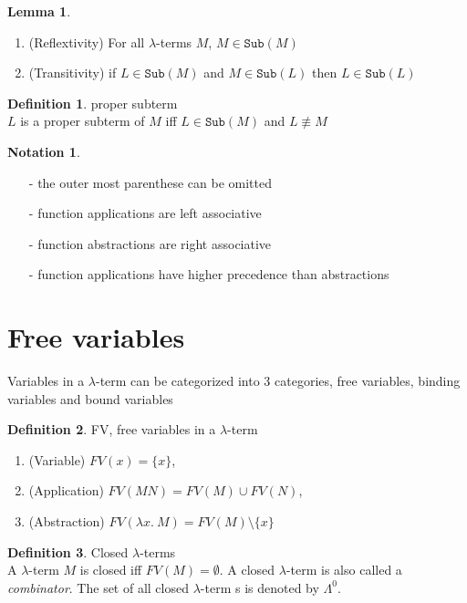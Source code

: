 \documentclass[a4paper]{book}
\theoremstyle{definition}
\newtheorem{definition}{Definition}[section]
\newtheorem{lemma}{Lemma}[section]
\newtheorem{notation}{Notation}[section]
\newcommand{\sub}[1]{\texttt{Sub}(#1)}
\newcommand{\lterm}{$\lambda$-term }
\begin{document}
\begin{lemma}
  \begin{enumerate}
    \item (Reflextivity) For all $\lambda$-terms $M$, $M \in \sub{M}$
    \item (Transitivity) if $L \in \sub{M}$ and $M \in \sub{L}$ then $L \in \sub{L}$
  \end{enumerate}
\end{lemma}
\begin{definition}
  proper subterm\\
  $L$ is a proper subterm of $M$ iff $L \in \sub{M}$ and $L \not\equiv M$
\end{definition}
\begin{notation}
  \begin{itemize}
    \item[-] the outer most parenthese can be omitted
    \item[-] function applications are left associative
    \item[-] function abstractions are right associative
    \item[-] function applications have higher precedence than abstractions
  \end{itemize}
\end{notation}
\section{Free variables}
Variables in a $\lambda$-term can be categorized into 3 categories, free variables, binding variables and bound variables
\begin{definition}
  FV, free variables in a $\lambda$-term\\
  \begin{enumerate}
    \item (Variable) $FV(x) = \{x\}$,
    \item (Application) $FV(M N) = FV(M) \cup FV(N)$,
    \item (Abstraction) $FV(\lambda x.\ M) = FV(M) \setminus \{x\}$
  \end{enumerate}
\end{definition}
\begin{definition}
  Closed $\lambda$-terms\\
  A $\lambda$-term $M$ is closed iff $FV(M) = \emptyset$. A closed \lterm is also called a \textit{combinator}.
  The set of all closed \lterm s is denoted by $\Lambda^0$.
\end{definition}
\end{document}
